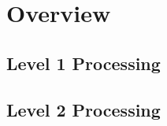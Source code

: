 \chapter{Overview}
\label{chapter:overview}


\section{Level 1 Processing}

\section{Level 2 Processing}




